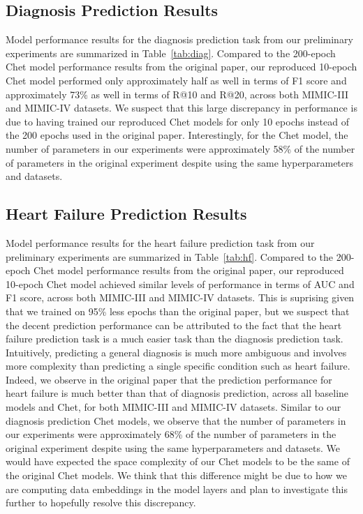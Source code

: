 \documentclass[11pt,a4paper,fleqn]{article}
\begin{document}
\subsection{Diagnosis Prediction Results}
Model performance results for the diagnosis prediction task from our preliminary
experiments are summarized in Table~\ref{tab:diag}. Compared to the 200-epoch
Chet model performance results from the original paper, our reproduced 10-epoch
Chet model performed only approximately half as well in terms of F1 score and
approximately 73\% as well in terms of R@10 and R@20, across both MIMIC-III and
MIMIC-IV datasets. We suspect that this large discrepancy in performance is due
to having trained our reproduced Chet models for only 10 epochs instead of the
200 epochs used in the original paper. Interestingly, for the Chet model, the
number of parameters in our experiments were approximately 58\% of the number of
parameters in the original experiment despite using the same hyperparameters and
datasets.

\subsection{Heart Failure Prediction Results}
Model performance results for the heart failure prediction task from our
preliminary experiments are summarized in Table~\ref{tab:hf}. Compared to the
200-epoch Chet model performance results from the original paper, our reproduced
10-epoch Chet model achieved similar levels of performance in terms of AUC and
F1 score, across both MIMIC-III and MIMIC-IV datasets. This is suprising given
that we trained on 95\% less epochs than the original paper, but we suspect that
the decent prediction performance can be attributed to the fact that the heart
failure prediction task is a much easier task than the diagnosis prediction
task. Intuitively, predicting a general diagnosis is much more ambiguous and
involves more complexity than predicting a single specific condition such as
heart failure. Indeed, we observe in the original paper that the prediction
performance for heart failure is much better than that of diagnosis prediction,
across all baseline models and Chet, for both MIMIC-III and MIMIC-IV datasets.
Similar to our diagnosis prediction Chet models, we observe that the number of
parameters in our experiments were approximately 68\% of the number of
parameters in the original experiment despite using the same hyperparameters and
datasets. We would have expected the space complexity of our Chet models to be
the same of the original Chet models. We think that this difference might be due
to how we are computing data embeddings in the model layers and plan to
investigate this further to hopefully resolve this discrepancy.
\end{document}
